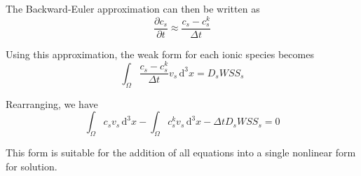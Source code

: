 The Backward-Euler approximation can then be written as
\begin{equation}
\frac{\partial c_s}{\partial t} \approx \frac{c_s - c_s^k}{\Delta t}
\end{equation}

Using this approximation, the weak form for each ionic species becomes
\begin{equation}
\int_\Omega \frac{c_s - c_s^k}{\Delta t} v_s \,\mathrm{d}^3x
= D_s WSS_s
\end{equation}
 
Rearranging, we have
\begin{equation}
\int_\Omega c_s  v_s \,\mathrm{d}^3x
- \int_\Omega c_s^k  v_s \,\mathrm{d}^3x
- \Delta t D_s WSS_s = 0
\end{equation}

This form is suitable for the addition of all equations into a single
nonlinear form for solution.
